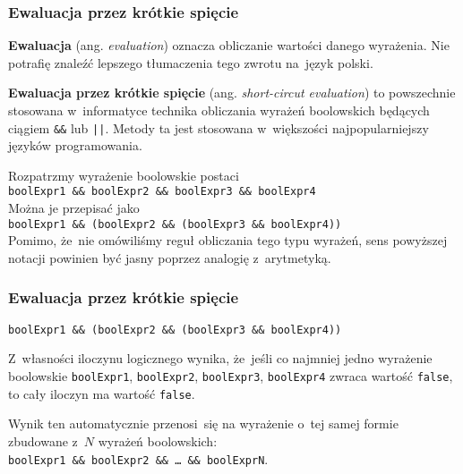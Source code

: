 \documentclass[10pt,t]{beamer}
\begin{document}
\begin{frame}
  \frametitle{Ewaluacja przez krótkie spięcie}


  \textbf{Ewaluacja} (ang. \textit{evaluation}) oznacza obliczanie wartości
  danego wyrażenia. Nie potrafię znaleźć lepszego tłumaczenia tego zwrotu
  na~język polski.

  \textbf{Ewaluacja przez krótkie spięcie} (ang. \textit{short-circut
    evaluation}) to powszechnie stosowana w~informatyce technika obliczania
  wyrażeń boolowskich będących ciągiem \texttt{\&\&} lub \texttt{||}.
  Metody ta jest stosowana w~większości najpopularniejszy języków
  programowania.

  Rozpatrzmy wyrażenie boolowskie postaci \\
  \texttt{boolExpr1 \&\& boolExpr2 \&\& boolExpr3 \&\& boolExpr4} \\
  Można je przepisać jako \\
  \texttt{boolExpr1 \&\& (boolExpr2 \&\& (boolExpr3 \&\& boolExpr4))} \\
  Pomimo, że~nie omówiliśmy reguł obliczania tego typu wyrażeń, sens
  powyższej notacji powinien być jasny poprzez analogię z~arytmetyką.

\end{frame}





\begin{frame}
  \frametitle{Ewaluacja przez krótkie spięcie}


  \texttt{boolExpr1 \&\& (boolExpr2 \&\& (boolExpr3 \&\& boolExpr4))}

  Z~własności iloczynu logicznego wynika, że~jeśli co najmniej jedno
  wyrażenie boolowskie \texttt{boolExpr1}, \texttt{boolExpr2},
  \texttt{boolExpr3}, \texttt{boolExpr4} zwraca wartość \texttt{false}, to
  cały iloczyn ma wartość \texttt{false}.

  Wynik ten automatycznie przenosi~się na wyrażenie o~tej samej formie
  zbudowane z~$N$ wyrażeń boolowskich: \\
  \texttt{boolExpr1 \&\& boolExpr2 \&\& \ldots{} \&\& boolExprN}.

\end{frame}
\end{document}
